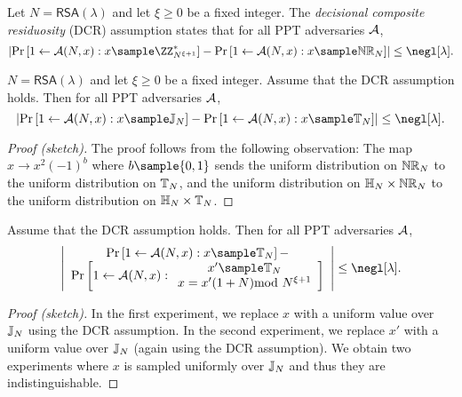 \begin{definition}
Let $N=\mathsf{RSA}(\lambda)$ and let $\xi\geq 0$ be a fixed integer. The \emph{decisional composite residuosity} (DCR) assumption states that for all PPT adversaries $\mathcal{A}$, $$\left|\Pr\left[1\leftarrow\Ac(N,x):x\sample \ZZ_{N^{\xi+1}}^*\right]-\Pr\left[1\leftarrow\Ac(N,x):x\sample \mathbb{NR}_N\right]\right|\leq \negl[\lambda].$$
\end{definition}


\begin{lemma}
\label{lemma:DCRforQR}
$N=\mathsf{RSA}(\lambda)$ and let $\xi\geq 0$ be a fixed integer. Assume that the DCR assumption holds. Then for all PPT adversaries $\mathcal{A}$, $$\left|\Pr\left[1\leftarrow\Ac(N,x):
        x\sample \mathbb{J}_N
\right]-\Pr\left[1\leftarrow\Ac(N,x):x\sample \TT_N\right]\right|\leq \negl[\lambda].$$
\end{lemma}
\begin{proof}[Proof (sketch)]

The proof follows from the following observation: The map $x\to x^2(-1)^b$ where $b\sample \bits$ sends the uniform distribution on $\mathbb{NR}_N$ to the uniform distribution on $\mathbb{T}_N$, and the uniform distribution on $ \mathbb{H}_N\times\mathbb{NR}_N$ to the uniform distribution on $\mathbb{H}_N\times\mathbb{T}_N$.
\end{proof}



\begin{corollary}
\label{lemma:variantDCR}
Assume that the DCR assumption holds. Then for all PPT adversaries $\mathcal{A}$,
$$\left|\begin{array}{c}
     \Pr\left[1\leftarrow\Ac(N,x):x\sample \TT_N\right]-  \\
     \Pr\left[1\leftarrow\Ac(N,x):\begin{array}{c}
     x'\sample \TT_N \\
     x=x'(1+N) \smod N^{\xi+1}
\end{array}\right]
\end{array} \right|\leq \negl[\lambda].$$
\end{corollary}

\begin{proof}[Proof (sketch)]
In the first experiment, we replace $x$ with a uniform value over $\mathbb{J}_N$ using the DCR assumption. In the second experiment, we replace $x'$ with a uniform value over $\mathbb{J}_N$ (again using the DCR assumption). We obtain two experiments where $x$ is sampled uniformly over  $\mathbb{J}_N$ and thus they are indistinguishable.
\end{proof}


